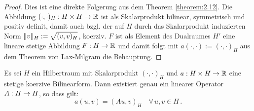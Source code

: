 \begin{proof}
Dies ist eine direkte Folgerung aus dem Theorem \ref{theorem:2.12}. Die Abbildung $(\cdot,\cdot)_H:H\times H \rightarrow \mathbb{R}$ ist als Skalarprodukt bilinear, symmetrisch und positiv definit, damit auch bzgl. der auf $H$ durch das Skalarprodukt induzierten Norm $\lVert v\rVert_H := \sqrt{(v,v)_H}$, koerziv. $F$ ist als Element des Dualraumes $H'$ eine lineare stetige Abbildung $F:H\rightarrow\mathbb{R}$ und damit folgt mit $a(\cdot,\cdot) :=(\cdot,\cdot)_H$ aus dem Theorem von Lax-Milgram die Behauptung.
\end{proof}


\begin{lemma}\label{lem:2.16}
Es sei $H$ ein Hilbertraum mit Skalarprodukt $(\cdot,\cdot)_H$ und $a:H\times H\rightarrow \mathbb{R}$ eine stetige koerzive Bilinearform. Dann existiert genau ein linearer Operator $A : H \rightarrow H$, so dass gilt:
\[
	a(u,v)  = (Au,v)_H \quad \forall \, u , v \in H \, .
\]
\end{lemma}

